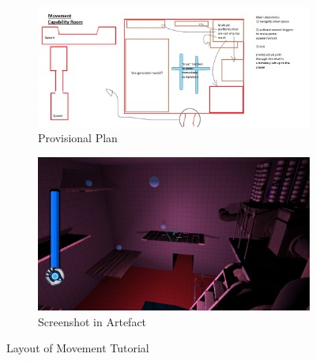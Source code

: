 \begin{figure}[H]
\centering
\begin{subfigure}{0.5\textwidth}
  \centering
  \includegraphics[width=1\linewidth]{Figures/mcapplan.png}
  \caption{Provisional Plan}
\end{subfigure}%
\begin{subfigure}{0.5\textwidth}
  \centering
  \includegraphics[width=1\linewidth]{Figures/mcap.png}
  \caption{Screenshot in Artefact}
\end{subfigure}
\caption{Layout of Movement Tutorial}
\end{figure}

